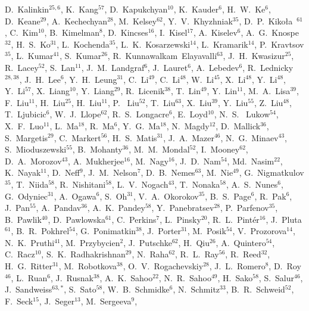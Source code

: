 {D.~Kalinkin$^{25,6}$,
K.~Kang$^{57}$,
D.~Kapukchyan$^{10}$,
K.~Kauder$^{6}$,
H.~W.~Ke$^{6}$,
D.~Keane$^{29}$,
A.~Kechechyan$^{28}$,
M.~Kelsey$^{62}$,
Y.~V.~Khyzhniak$^{35}$,
D.~P.~Kiko\l{}a~$^{61}$,
C.~Kim$^{10}$,
B.~Kimelman$^{8}$,
D.~Kincses$^{16}$,
I.~Kisel$^{17}$,
A.~Kiselev$^{6}$,
A.~G.~Knospe$^{32}$,
H.~S.~Ko$^{31}$,
L.~Kochenda$^{35}$,
L.~K.~Kosarzewski$^{14}$,
L.~Kramarik$^{14}$,
P.~Kravtsov$^{35}$,
L.~Kumar$^{41}$,
S.~Kumar$^{26}$,
R.~Kunnawalkam~Elayavalli$^{63}$,
J.~H.~Kwasizur$^{25}$,
R.~Lacey$^{52}$,
S.~Lan$^{11}$,
J.~M.~Landgraf$^{6}$,
J.~Lauret$^{6}$,
A.~Lebedev$^{6}$,
R.~Lednicky$^{28,38}$,
J.~H.~Lee$^{6}$,
Y.~H.~Leung$^{31}$,
C.~Li$^{49}$,
C.~Li$^{48}$,
W.~Li$^{45}$,
X.~Li$^{48}$,
Y.~Li$^{48}$,
Y.~Li$^{57}$,
X.~Liang$^{10}$,
Y.~Liang$^{29}$,
R.~Licenik$^{38}$,
T.~Lin$^{49}$,
Y.~Lin$^{11}$,
M.~A.~Lisa$^{39}$,
F.~Liu$^{11}$,
H.~Liu$^{25}$,
H.~Liu$^{11}$,
P.~ Liu$^{52}$,
T.~Liu$^{63}$,
X.~Liu$^{39}$,
Y.~Liu$^{55}$,
Z.~Liu$^{48}$,
T.~Ljubicic$^{6}$,
W.~J.~Llope$^{62}$,
R.~S.~Longacre$^{6}$,
E.~Loyd$^{10}$,
N.~S.~ Lukow$^{54}$,
X.~F.~Luo$^{11}$,
L.~Ma$^{18}$,
R.~Ma$^{6}$,
Y.~G.~Ma$^{18}$,
N.~Magdy$^{12}$,
D.~Mallick$^{36}$,
S.~Margetis$^{29}$,
C.~Markert$^{56}$,
H.~S.~Matis$^{31}$,
J.~A.~Mazer$^{46}$,
N.~G.~Minaev$^{43}$,
S.~Mioduszewski$^{55}$,
B.~Mohanty$^{36}$,
M.~M.~Mondal$^{52}$,
I.~Mooney$^{62}$,
D.~A.~Morozov$^{43}$,
A.~Mukherjee$^{16}$,
M.~Nagy$^{16}$,
J.~D.~Nam$^{54}$,
Md.~Nasim$^{22}$,
K.~Nayak$^{11}$,
D.~Neff$^{9}$,
J.~M.~Nelson$^{7}$,
D.~B.~Nemes$^{63}$,
M.~Nie$^{49}$,
G.~Nigmatkulov$^{35}$,
T.~Niida$^{58}$,
R.~Nishitani$^{58}$,
L.~V.~Nogach$^{43}$,
T.~Nonaka$^{58}$,
A.~S.~Nunes$^{6}$,
G.~Odyniec$^{31}$,
A.~Ogawa$^{6}$,
S.~Oh$^{31}$,
V.~A.~Okorokov$^{35}$,
B.~S.~Page$^{6}$,
R.~Pak$^{6}$,
J.~Pan$^{55}$,
A.~Pandav$^{36}$,
A.~K.~Pandey$^{58}$,
Y.~Panebratsev$^{28}$,
P.~Parfenov$^{35}$,
B.~Pawlik$^{40}$,
D.~Pawlowska$^{61}$,
C.~Perkins$^{7}$,
L.~Pinsky$^{20}$,
R.~L.~Pint\'{e}r$^{16}$,
J.~Pluta$^{61}$,
B.~R.~Pokhrel$^{54}$,
G.~Ponimatkin$^{38}$,
J.~Porter$^{31}$,
M.~Posik$^{54}$,
V.~Prozorova$^{14}$,
N.~K.~Pruthi$^{41}$,
M.~Przybycien$^{2}$,
J.~Putschke$^{62}$,
H.~Qiu$^{26}$,
A.~Quintero$^{54}$,
C.~Racz$^{10}$,
S.~K.~Radhakrishnan$^{29}$,
N.~Raha$^{62}$,
R.~L.~Ray$^{56}$,
R.~Reed$^{32}$,
H.~G.~Ritter$^{31}$,
M.~Robotkova$^{38}$,
O.~V.~Rogachevskiy$^{28}$,
J.~L.~Romero$^{8}$,
D.~Roy$^{46}$,
L.~Ruan$^{6}$,
J.~Rusnak$^{38}$,
A.~K.~Sahoo$^{22}$,
N.~R.~Sahoo$^{49}$,
H.~Sako$^{58}$,
S.~Salur$^{46}$,
J.~Sandweiss$^{63,*}$,
S.~Sato$^{58}$,
W.~B.~Schmidke$^{6}$,
N.~Schmitz$^{33}$,
B.~R.~Schweid$^{52}$,
F.~Seck$^{15}$,
J.~Seger$^{13}$,
M.~Sergeeva$^{9}$,
}
